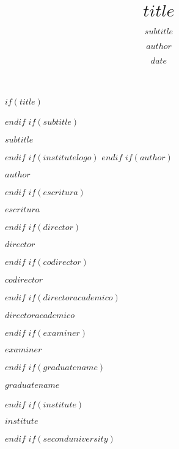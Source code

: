 \documentclass[msc,oneside,a4paper]{udelar} %
\title{$title$}
\subtitle{$subtitle$}
\author{$author$}
\institute{$institute$}
\date{$date$}
\begin{document}
$if(title)$
  \maketitle
$endif$
$if(subtitle)$
  \begin{subtitle}
    $subtitle$
  \end{subtitle}
$endif$
$if(institutelogo)$
$endif$
$if(author)$
  \begin{author}
    $author$
  \end{author}
$endif$
$if(escritura)$
  \begin{escritura}
    $escritura$
  \end{escritura}
$endif$
$if(director)$
  \begin{director}
    $director$
  \end{director}
$endif$
$if(codirector)$
  \begin{codirector}
    $codirector$
  \end{codirector}
$endif$
$if(directoracademico)$
  \begin{directoracademico}
    $directoracademico$
  \end{directoracademico}
$endif$
$if(examiner)$
  \begin{examiner}
    $examiner$
  \end{examiner}
$endif$
$if(graduatename)$
  \begin{graduatename}
    $graduatename$
  \end{graduatename}
$endif$
$if(institute)$
  \begin{institute}
    $institute$
  \end{institute}
$endif$
$if(seconduniversity)$
\end{document}

